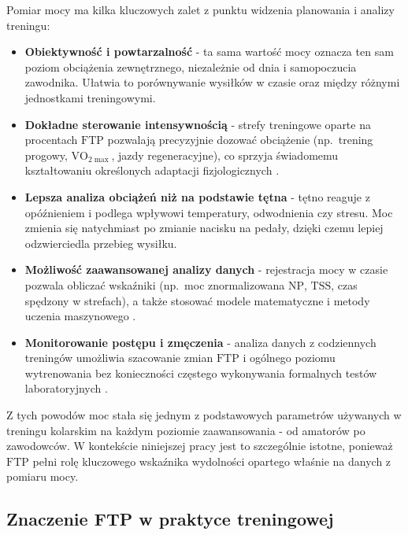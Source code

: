 Pomiar mocy ma kilka kluczowych zalet z punktu widzenia planowania i analizy treningu:
\begin{itemize}
  \item \textbf{Obiektywność i powtarzalność} - ta sama wartość mocy oznacza ten sam poziom obciążenia zewnętrznego, niezależnie od dnia i samopoczucia zawodnika. Ułatwia to porównywanie wysiłków w czasie oraz między różnymi jednostkami treningowymi.
  \item \textbf{Dokładne sterowanie intensywnością} - strefy treningowe oparte na procentach $\mathrm{FTP}$ pozwalają precyzyjnie dozować obciążenie (np.\ trening progowy, $\text{VO}_{2\max}$, jazdy regeneracyjne), co sprzyja świadomemu kształtowaniu określonych adaptacji fizjologicznych \cite{allen2019power}.
  \item \textbf{Lepsza analiza obciążeń niż na podstawie tętna} - tętno reaguje z opóźnieniem i podlega wpływowi temperatury, odwodnienia czy stresu. Moc zmienia się natychmiast po zmianie nacisku na pedały, dzięki czemu lepiej odzwierciedla przebieg wysiłku.
  \item \textbf{Możliwość zaawansowanej analizy danych} - rejestracja mocy w czasie pozwala obliczać wskaźniki (np.\ moc znormalizowana $\mathrm{NP}$, $\mathrm{TSS}$, czas spędzony w strefach), a także stosować modele matematyczne i metody uczenia maszynowego \cite{stockwell2023mlftp,denham2020predictftp}.
  \item \textbf{Monitorowanie postępu i zmęczenia} - analiza danych z codziennych treningów umożliwia szacowanie zmian $\mathrm{FTP}$ i ogólnego poziomu wytrenowania bez konieczności częstego wykonywania formalnych testów laboratoryjnych \cite{borszcz2018ftp,karsten2021cpftp,denham2020predictftp}.
\end{itemize}

Z tych powodów moc stała się jednym z podstawowych parametrów używanych w treningu kolarskim na każdym poziomie zaawansowania - od amatorów po zawodowców.
W kontekście niniejszej pracy jest to szczególnie istotne, ponieważ $\mathrm{FTP}$ pełni rolę kluczowego wskaźnika wydolności opartego właśnie na danych z pomiaru mocy.

\subsection{Znaczenie FTP w praktyce treningowej}

